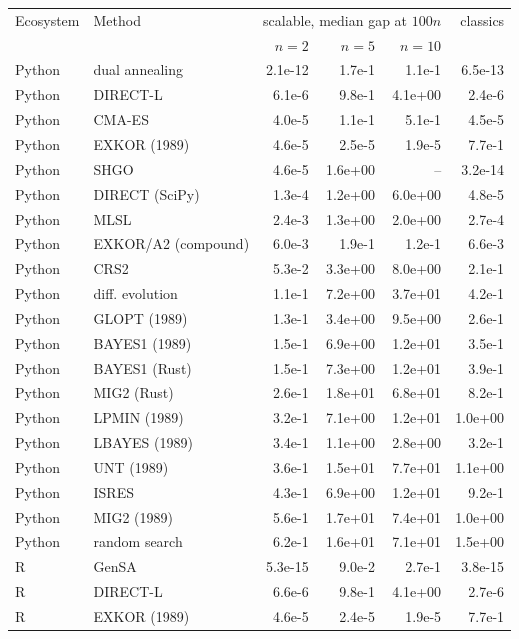 \begin{tabular}{llrrrr}
\toprule
Ecosystem & Method & \multicolumn{3}{c}{scalable, median gap at $100n$} & classics \\
 & & $n{=}2$ & $n{=}5$ & $n{=}10$ & \\
\midrule
Python & dual annealing & 2.1e-12 & 1.7e-1 & 1.1e-1 & 6.5e-13 \\
Python & DIRECT-L & 6.1e-6 & 9.8e-1 & 4.1e+00 & 2.4e-6 \\
Python & CMA-ES & 4.0e-5 & 1.1e-1 & 5.1e-1 & 4.5e-5 \\
Python & EXKOR (1989) & 4.6e-5 & 2.5e-5 & 1.9e-5 & 7.7e-1 \\
Python & SHGO & 4.6e-5 & 1.6e+00 & -- & 3.2e-14 \\
Python & DIRECT (SciPy) & 1.3e-4 & 1.2e+00 & 6.0e+00 & 4.8e-5 \\
Python & MLSL & 2.4e-3 & 1.3e+00 & 2.0e+00 & 2.7e-4 \\
Python & EXKOR/A2 (compound) & 6.0e-3 & 1.9e-1 & 1.2e-1 & 6.6e-3 \\
Python & CRS2 & 5.3e-2 & 3.3e+00 & 8.0e+00 & 2.1e-1 \\
Python & diff. evolution & 1.1e-1 & 7.2e+00 & 3.7e+01 & 4.2e-1 \\
Python & GLOPT (1989) & 1.3e-1 & 3.4e+00 & 9.5e+00 & 2.6e-1 \\
Python & BAYES1 (1989) & 1.5e-1 & 6.9e+00 & 1.2e+01 & 3.5e-1 \\
Python & BAYES1 (Rust) & 1.5e-1 & 7.3e+00 & 1.2e+01 & 3.9e-1 \\
Python & MIG2 (Rust) & 2.6e-1 & 1.8e+01 & 6.8e+01 & 8.2e-1 \\
Python & LPMIN (1989) & 3.2e-1 & 7.1e+00 & 1.2e+01 & 1.0e+00 \\
Python & LBAYES (1989) & 3.4e-1 & 1.1e+00 & 2.8e+00 & 3.2e-1 \\
Python & UNT (1989) & 3.6e-1 & 1.5e+01 & 7.7e+01 & 1.1e+00 \\
Python & ISRES & 4.3e-1 & 6.9e+00 & 1.2e+01 & 9.2e-1 \\
Python & MIG2 (1989) & 5.6e-1 & 1.7e+01 & 7.4e+01 & 1.0e+00 \\
Python & random search & 6.2e-1 & 1.6e+01 & 7.1e+01 & 1.5e+00 \\
\midrule
R & GenSA & 5.3e-15 & 9.0e-2 & 2.7e-1 & 3.8e-15 \\
R & DIRECT-L & 6.6e-6 & 9.8e-1 & 4.1e+00 & 2.7e-6 \\
R & EXKOR (1989) & 4.6e-5 & 2.4e-5 & 1.9e-5 & 7.7e-1 \\

\end{tabular}
